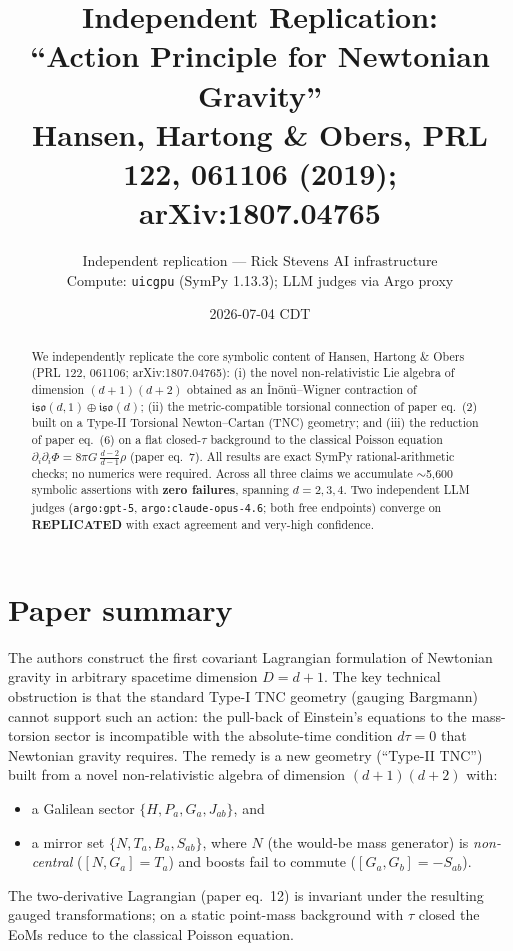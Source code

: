 \documentclass[11pt]{article}
\title{Independent Replication: \\
       ``Action Principle for Newtonian Gravity''\\
       \large Hansen, Hartong \& Obers, PRL {\bf 122}, 061106 (2019); arXiv:1807.04765}
\author{Independent replication --- Rick Stevens AI infrastructure\\
        \small Compute: \texttt{uicgpu} (SymPy 1.13.3); LLM judges via Argo proxy}
\date{2026-07-04 CDT}
\begin{document}
\maketitle

\begin{abstract}
We independently replicate the core symbolic content of Hansen, Hartong \& Obers
(PRL 122, 061106; arXiv:1807.04765): (i) the novel non-relativistic Lie algebra of
dimension $(d+1)(d+2)$ obtained as an \.In\"on\"u--Wigner contraction of
$\mathfrak{iso}(d,1)\oplus\mathfrak{iso}(d)$; (ii) the metric-compatible torsional
connection of paper eq.~(2) built on a Type-II Torsional Newton--Cartan (TNC)
geometry; and (iii) the reduction of paper eq.~(6) on a flat closed-$\tau$
background to the classical Poisson equation
$\partial_i\partial_i \Phi = 8\pi G\,\tfrac{d-2}{d-1}\rho$ (paper eq.~7).
All results are exact SymPy rational-arithmetic checks; no numerics were required.
Across all three claims we accumulate $\sim$5{,}600 symbolic assertions with
{\bf zero failures}, spanning $d=2,3,4$. Two independent LLM judges
(\texttt{argo:gpt-5}, \texttt{argo:claude-opus-4.6}; both free endpoints) converge
on \textbf{REPLICATED} with exact agreement and very-high confidence.
\end{abstract}

\section{Paper summary}
The authors construct the first covariant Lagrangian formulation of Newtonian
gravity in arbitrary spacetime dimension $D=d+1$. The key technical obstruction is
that the standard Type-I TNC geometry (gauging Bargmann) cannot support such an
action: the pull-back of Einstein's equations to the mass-torsion sector is
incompatible with the absolute-time condition $d\tau=0$ that Newtonian gravity
requires. The remedy is a new geometry (``Type-II TNC'') built from a novel
non-relativistic algebra of dimension $(d+1)(d+2)$ with:
\begin{itemize}
  \item a Galilean sector $\{H, P_a, G_a, J_{ab}\}$, and
  \item a mirror set $\{N, T_a, B_a, S_{ab}\}$, where $N$ (the would-be mass
        generator) is \emph{non-central} ($[N,G_a]=T_a$) and boosts fail to commute
        ($[G_a,G_b]=-S_{ab}$).
\end{itemize}
The two-derivative Lagrangian (paper eq.~12) is invariant under the resulting
gauged transformations; on a static point-mass background with $\tau$ closed the
EoMs reduce to the classical Poisson equation.
\end{document}
